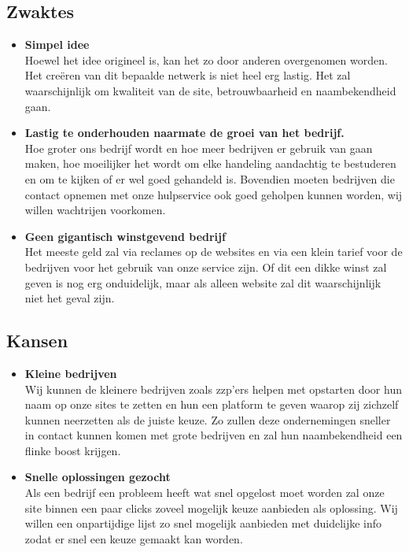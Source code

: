 \documentclass[11pt,oneside,a4paper,numbers=enddot]{report} %
\begin{document}
\subsection{Zwaktes}
\begin{itemize}
\item {\bf Simpel idee} \\
  Hoewel het idee origineel is, kan het zo door anderen overgenomen worden. Het creëren van dit bepaalde netwerk is niet heel erg lastig. Het zal waarschijnlijk om kwaliteit van de site, betrouwbaarheid en naambekendheid gaan.
\item {\bf Lastig te onderhouden naarmate de groei van het bedrijf.} \\
  Hoe groter ons bedrijf wordt en hoe meer bedrijven er gebruik van gaan maken, hoe moeilijker het  wordt om elke handeling aandachtig te bestuderen en om te kijken of er wel goed gehandeld is. Bovendien moeten bedrijven die contact opnemen met onze hulpservice ook goed geholpen kunnen worden, wij willen wachtrijen voorkomen.
\item {\bf Geen gigantisch winstgevend bedrijf} \\
  Het meeste geld zal via reclames op de websites en via een klein tarief voor de bedrijven voor het gebruik van onze service zijn. Of dit een dikke winst zal geven is nog erg onduidelijk, maar als alleen website zal dit waarschijnlijk niet het geval zijn.
\end{itemize}
\subsection{Kansen}
\begin{itemize}
\item {\bf Kleine bedrijven} \\
  Wij kunnen de kleinere bedrijven zoals zzp’ers helpen met opstarten door hun naam op onze sites te zetten en hun een platform te geven waarop zij zichzelf kunnen neerzetten als de juiste keuze. Zo zullen deze ondernemingen sneller in contact kunnen komen met grote bedrijven en zal hun naambekendheid een flinke boost krijgen.
\item {\bf Snelle oplossingen gezocht} \\
  Als een bedrijf een probleem heeft wat snel opgelost moet worden zal onze site binnen een paar clicks zoveel mogelijk keuze aanbieden als oplossing. Wij willen een onpartijdige lijst zo snel mogelijk aanbieden met duidelijke info zodat er snel een keuze gemaakt kan worden.
\end{itemize}
\end{document}
